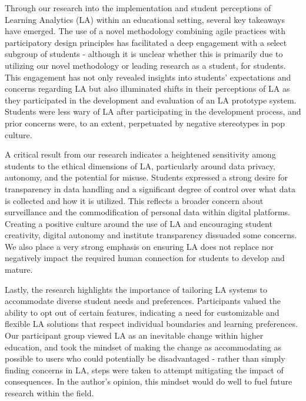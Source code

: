 \documentclass{l4proj}
\begin{document}
Through our research into the implementation and student perceptions of Learning Analytics (LA) within an educational setting, several key takeaways have emerged. The use of a novel methodology combining agile practices with participatory design principles has facilitated a deep engagement with a select subgroup of students - although it is unclear whether this is primarily due to utilizing our novel methodology or leading research as a student, for students. This engagement has not only revealed insights into students' expectations and concerns regarding LA but also illuminated shifts in their perceptions of LA as they participated in the development and evaluation of an LA prototype system. Students were less wary of LA after participating in the development process, and prior concerns were, to an extent, perpetuated by negative stereotypes in pop culture. 

A critical result from our research indicates a heightened sensitivity among students to the ethical dimensions of LA, particularly around data privacy, autonomy, and the potential for misuse. Students expressed a strong desire for transparency in data handling and a significant degree of control over what data is collected and how it is utilized. This reflects a broader concern about surveillance and the commodification of personal data within digital platforms. Creating a positive culture around the use of LA and encouraging student creativity, digital autonomy and institute transparency dissuaded some concerns. We also place a very strong emphasis on ensuring LA does not replace nor negatively impact the required human connection for students to develop and mature.

Lastly, the research highlights the importance of tailoring LA systems to accommodate diverse student needs and preferences. Participants valued the ability to opt out of certain features, indicating a need for customizable and flexible LA solutions that respect individual boundaries and learning preferences. Our participant group viewed LA as an inevitable change within higher education, and took the mindset of making the change as accommodating as possible to users who could potentially be disadvantaged - rather than simply finding concerns in LA, steps were taken to attempt mitigating the impact of consequences. In the author's opinion, this mindset would do well to fuel future research within the field.


\end{document}
